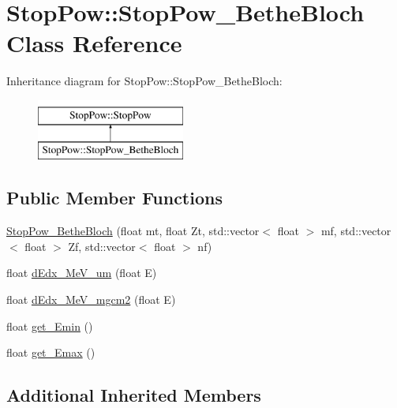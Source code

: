 \hypertarget{class_stop_pow_1_1_stop_pow___bethe_bloch}{\section{Stop\-Pow\-:\-:Stop\-Pow\-\_\-\-Bethe\-Bloch Class Reference}
\label{class_stop_pow_1_1_stop_pow___bethe_bloch}
}
Inheritance diagram for Stop\-Pow\-:\-:Stop\-Pow\-\_\-\-Bethe\-Bloch\-:\begin{figure}[H]
\begin{center}
\leavevmode
\includegraphics[height=2.000000cm]{class_stop_pow_1_1_stop_pow___bethe_bloch}
\end{center}
\end{figure}
\subsection*{Public Member Functions}
\begin{DoxyCompactItemize}
\item 
\hyperlink{class_stop_pow_1_1_stop_pow___bethe_bloch_ace598f357ec3278c5765377d317944b7}{Stop\-Pow\-\_\-\-Bethe\-Bloch} (float mt, float Zt, std\-::vector$<$ float $>$ mf, std\-::vector$<$ float $>$ Zf, std\-::vector$<$ float $>$ nf)
\item 
float \hyperlink{class_stop_pow_1_1_stop_pow___bethe_bloch_a9c1f3854cc7099c583af66640ffb8223}{d\-Edx\-\_\-\-Me\-V\-\_\-um} (float E)
\item 
float \hyperlink{class_stop_pow_1_1_stop_pow___bethe_bloch_a385fe657e4f3bea2142198e85689c9d6}{d\-Edx\-\_\-\-Me\-V\-\_\-mgcm2} (float E)
\item 
float \hyperlink{class_stop_pow_1_1_stop_pow___bethe_bloch_ae191d6514c38ec7dce0b007f1d63ffef}{get\-\_\-\-Emin} ()
\item 
float \hyperlink{class_stop_pow_1_1_stop_pow___bethe_bloch_a1c554f5107763f3dc37e07776b544f56}{get\-\_\-\-Emax} ()
\end{DoxyCompactItemize}
\subsection*{Additional Inherited Members}


